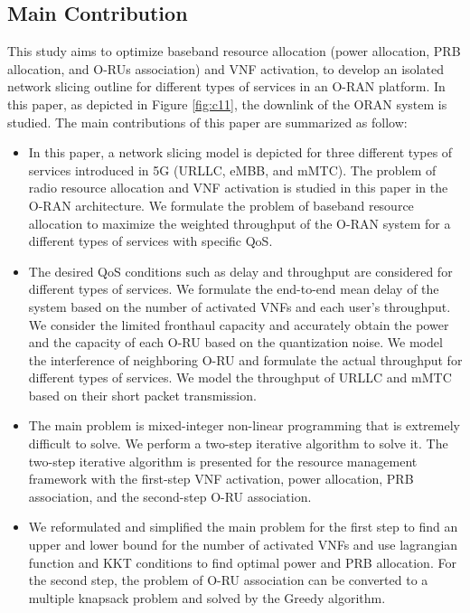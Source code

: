 \documentclass[conference]{IEEEtran}
\begin{document}
\subsection{Main Contribution}
This study aims to optimize baseband resource allocation (power allocation, PRB allocation, and O-RUs association) and VNF activation, to develop an isolated network slicing outline for different types of services in an O-RAN platform. In this paper, as depicted in Figure \ref{fig:c11}, the downlink of the ORAN system is studied. The main contributions of this paper are summarized as follow:
\begin{itemize}
\item In this paper, a network slicing model is depicted for three different types of services introduced in 5G (URLLC, eMBB, and mMTC). The problem of radio resource allocation and VNF activation is studied in this paper in the O-RAN architecture.
We formulate the problem of baseband resource allocation to maximize the weighted throughput of the O-RAN system for a different types of services with specific QoS. 
\item The desired QoS conditions such as delay and throughput are considered for different types of services. We formulate the end-to-end mean delay of the system based on the number of activated VNFs and each user's throughput.
We consider the limited fronthaul capacity and accurately obtain the power and the capacity of each O-RU based on the quantization noise.
We model the interference of neighboring O-RU and formulate the actual throughput
for different types of services. We model the throughput of URLLC and mMTC based on their short packet transmission.
\item The main problem is mixed-integer non-linear programming that is extremely difficult to solve.
We perform a two-step iterative algorithm to solve it.
The two-step iterative algorithm is presented for the resource management framework with the first-step VNF activation, power allocation, PRB association, and the second-step O-RU association.
\item We reformulated and simplified the main problem for the first step to find an upper and lower bound for the number of activated VNFs and use lagrangian function and KKT conditions to find optimal power and PRB allocation.
For the second step, the problem of O-RU association can be converted to a multiple knapsack problem and solved by the Greedy algorithm.
\end{itemize}  
\end{document}
